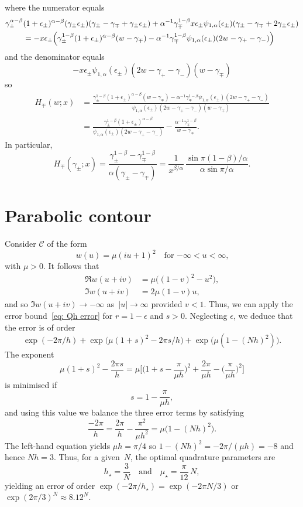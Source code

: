 \documentclass[12pt,a4paper]{article}
\begin{document}
where the numerator equals
\begin{align*}
\gamma_\pm^{\alpha-\beta}&(1+\epsilon_\pm)^{\alpha-\beta}
(\gamma_\pm\epsilon_\pm)
(\gamma_\pm-\gamma_\mp+\gamma_\pm\epsilon_\pm)
+\alpha^{-1}\gamma_\mp^{1-\beta}x\epsilon_\pm\psi_{1,\alpha}(\epsilon_\pm)
(\gamma_\pm-\gamma_\mp+2\gamma_\pm\epsilon_\pm)\\
&=-x\epsilon_\pm\Bigl(\gamma_\pm^{1-\beta}(1+\epsilon_\pm)^{\alpha-\beta}
(w-\gamma_\mp)
-\alpha^{-1}\gamma_\mp^{1-\beta}\psi_{1,\alpha}(\epsilon_\pm)
(2w-\gamma_+-\gamma_-)\Bigr)
\end{align*}
and the denominator equals
\[
-x\epsilon_\pm\psi_{1,\alpha}(\epsilon_\pm)
(2w-\gamma_+-\gamma_-)(w-\gamma_\mp)
\]
so
\begin{align*}
H_\mp(w;x)&=\frac{\gamma_\pm^{1-\beta}(1+\epsilon_\pm)^{\alpha-\beta} 
(w-\gamma_\mp)-\alpha^{-1}\gamma_\mp^{1-\beta}\psi_{1,\alpha}(\epsilon_\pm)
(2w-\gamma_+-\gamma_-)}%
{\psi_{1,\alpha}(\epsilon_\pm)(2w-\gamma_+-\gamma_-)(w-\gamma_\mp)}\\
&=\frac{\gamma_\pm^{1-\beta}(1+\epsilon_\pm)^{\alpha-\beta}}%
{\psi_{1,\alpha}(\epsilon_\pm)(2w-\gamma_+-\gamma_-)}
-\frac{\alpha^{-1}\gamma_\mp^{1-\beta}}{w-\gamma_\mp}.
\end{align*}
In particular,
\[
H_\mp(\gamma_\pm;x)=\frac{\gamma_\pm^{1-\beta}-\gamma_\mp^{1-\beta}}%
{\alpha(\gamma_\pm-\gamma_\mp)}=\frac{1}{x^{\beta/\alpha}}\,
\frac{\sin\pi(1-\beta)/\alpha}{\alpha\sin\pi/\alpha}.
\]
\section{Parabolic contour}
Consider $\mathcal{C}$ of the form
\[
w(u)=\mu(iu+1)^2\quad\text{for $-\infty<u<\infty$,}
\]
with $\mu>0$.  It follows that
\begin{align*}
\Re w(u+iv)&=\mu\bigl((1-v)^2-u^2\bigr),\\
\Im w(u+iv)&=2\mu(1-v)u,
\end{align*}
and so $\Im w(u+iv)\to-\infty$ as~$|u|\to\infty$ provided $v<1$.  Thus, we can 
apply the error bound~\eqref{eq: Qh error} for $r=1-\epsilon$ and $s>0$.
Neglecting $\epsilon$, we deduce that the error is of order
\[
\exp(-2\pi/h)+\exp\bigl(\mu(1+s)^2-2\pi s/h\bigr)
    +\exp\bigl(\mu(1-(Nh)^2)\bigr).
\]
The exponent
\[
\mu(1+s)^2-\frac{2\pi s}{h}=\mu\bigg[\biggl(1+s-\frac{\pi}{\mu h}\biggr)^2
    +\frac{2\pi}{\mu h}-\biggl(\frac{\pi}{\mu h}\biggr)^2\biggr]
\]
is minimised if
\[
s=1-\frac{\pi}{\mu h},
\]
and using this value we balance the three error terms by satisfying
\[
\frac{-2\pi}{h}=\frac{2\pi}{h}-\frac{\pi^2}{\mu h^2}=\mu\bigl(1-(Nh)^2\bigr).
\]
The left-hand equation yields $\mu h=\pi/4$ so $1-(Nh)^2=-2\pi/(\mu h)=-8$
and hence $Nh=3$.  Thus, for a given~$N$, the optimal quadrature parameters are
\[
h_\star=\frac{3}{N}\quad\text{and}\quad\mu_\star=\frac{\pi}{12}\,N,
\]
yielding an error of order $\exp(-2\pi/h_\star)=\exp(-2\pi N/3)$ or
$\exp(2\pi/3)^N\approx8.12^N$.
\end{document}

